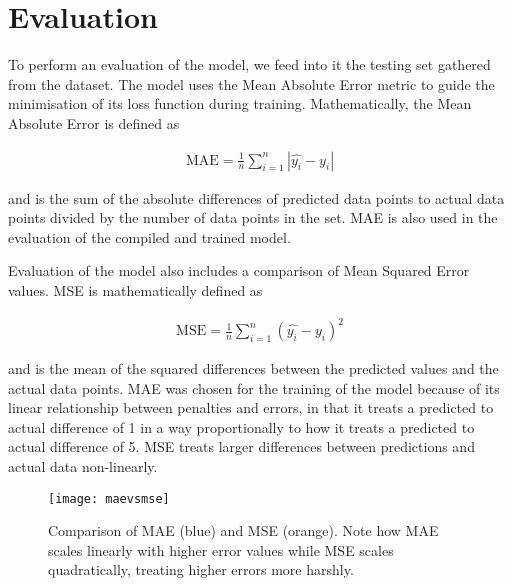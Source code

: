 \section{Evaluation}
To perform an evaluation of the model, we feed into it the testing set gathered from the dataset. The model uses the Mean Absolute Error metric to guide the minimisation of its loss function during training. Mathematically, the Mean Absolute Error is defined as

\begin{align}
    \text{MAE} = \frac{1}{n} \sum\limits_{i=1}^{n} {|\hat{y_i} - y_i|}
\end{align}

and is the sum of the absolute differences of predicted data points to actual data points divided by the number of data points in the set. MAE is also used in the evaluation of the compiled and trained model.

Evaluation of the model also includes a comparison of Mean Squared Error values. MSE is mathematically defined as

\begin{align}
    \text{MSE} = \frac{1}{n} \sum\limits_{i=1}^{n} {(\hat{y_i} - y_i)^2}    
\end{align}

and is the mean of the squared differences between the predicted values and the actual data points. MAE was chosen for the training of the model because of its linear relationship between penalties and errors, in that it treats a predicted to actual difference of 1 in a way proportionally to how it treats a predicted to actual difference of 5. MSE treats larger differences between predictions and actual data non-linearly. 

\begin{figure}[H]
    \centering
    \texttt{[image: maevsmse]}
    \caption{Comparison of MAE (blue) and MSE (orange). Note how MAE scales linearly with higher error values while MSE scales quadratically, treating higher errors more harshly.}
    \label{tab:maevsmse}
\end{figure}